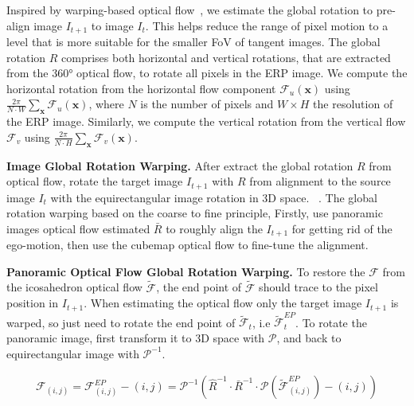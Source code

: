 Inspired by warping-based optical flow~\cite{BroxBPW2004}, we estimate the global rotation to pre-align image $I_{t+1}$ to image $I_{t}$.
This helps reduce the range of pixel motion to a level that is more suitable for the smaller FoV of tangent images.
%
The global rotation $R$ comprises both horizontal and vertical rotations, that are extracted from the 360° optical flow, to rotate all pixels in the ERP image.
%
We compute the horizontal rotation from the horizontal flow component $\mathcal{F}_u(\mathbf{x})$ using $\frac{2\pi}{N\cdot W}\sum_\mathbf{x}\mathcal{F}_u(\mathbf{x})$, where $N$ is the number of pixels and $W \!\times\! H$ the resolution of the ERP image.
%
Similarly, we compute the vertical rotation from the vertical flow $\mathcal{F}_v$ using  $\frac{2\pi}{N \cdot H}\sum_\mathbf{x}\mathcal{F}_v(\mathbf{x})$.


\textbf{Image Global Rotation Warping.}
After extract the global rotation $R$ from optical flow, rotate the target image $I_{t+1}$ with $R$ from alignment to the source image $I_{t}$ with the equirectangular image rotation in 3D space. ~\cite{ZioulKZAD2019}.
%
The global rotation warping based on the coarse to fine principle, 
Firstly, use panoramic images optical flow estimated $\bar{R}$ to roughly align the $I_{t+1}$ for getting rid of the ego-motion, then use the cubemap optical flow to fine-tune the alignment.

\textbf{Panoramic Optical Flow Global Rotation Warping.}
To restore the $\mathcal{F}$ from the icosahedron optical flow $\tilde{\mathcal{F}}$, the end point of $\tilde{\mathcal{F}}$ should trace to the pixel position in $I_{t+1}$.
% 
When estimating the optical flow only the target image $I_{t+1}$ is warped, so just need to rotate the end point of $\tilde{\mathcal{F}}_t$, i.e $\tilde{\mathcal{F}}^{EP}_t$. 
%
To rotate the panoramic image, first transform it to 3D space with $\mathcal{P}$, and back to equirectangular image with $\mathcal{P}^{-1}$.

\begin{equation}\label{equ:approach:globalwarp}
\begin{split}
	\mathcal{F}_{(i,j)} = \mathcal{F}^{EP}_{(i,j)} - (i,j)  
				= \mathcal{P}^{-1} \left( \hat{R}^{-1} \cdot \bar{R}^{-1} \cdot \mathcal{P}(\tilde{\mathcal{F}}^{EP}_{(i,j)}) - (i,j)\right)
\end{split}
\end{equation}
